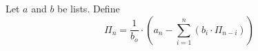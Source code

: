 \documentclass[12pt]{report}
\begin{document}
Let $a$ and $b$ be lists. Define 
$$ \Pi_n = \frac 1 {b_o} \cdot \left( a_n - \sum_{i=1}^n (b_i \cdot \Pi_{n-i}) \right) $$
\end{document}

